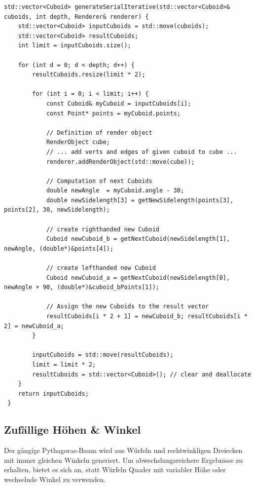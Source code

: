 \begin{lstlisting}[caption=Ausschnitt der iterativen generateSerielIterative() Funktion]
 std::vector<Cuboid> generateSerialIterative(std::vector<Cuboid>& cuboids, int depth, Renderer& renderer) {
	std::vector<Cuboid> inputCuboids = std::move(cuboids);
	std::vector<Cuboid> resultCuboids;
	int limit = inputCuboids.size();

	for (int d = 0; d < depth; d++) {
		resultCuboids.resize(limit * 2);

		for (int i = 0; i < limit; i++) {
			const Cuboid& myCuboid = inputCuboids[i];
			const Point* points = myCuboid.points;

			// Definition of render object
			RenderObject cube;
            // ... add verts and edges of given cuboid to cube ...
			renderer.addRenderObject(std::move(cube));

			// Computation of next Cuboids
			double newAngle  = myCuboid.angle - 30;
			double newSidelength[3] = getNewSidelength(points[3], points[2], 30, newSidelength);

            // create righthanded new Cuboid
			Cuboid newCuboid_b = getNextCuboid(newSidelength[1], newAngle, (double*)&points[4]);

            // create lefthanded new Cuboid
			Cuboid newCuboid_a = getNextCuboid(newSidelength[0], newAngle + 90, (double*)&cuboid_bPoints[1]);

			// Assign the new Cuboids to the result vector
			resultCuboids[i * 2 + 1] = newCuboid_b; resultCuboids[i * 2] = newCuboid_a;
		}

		inputCuboids = std::move(resultCuboids);
		limit = limit * 2;
		resultCuboids = std::vector<Cuboid>(); // clear and deallocate
	}
	return inputCuboids;
 }
\end{lstlisting}
\subsection{Zufällige Höhen \& Winkel}
\vspace{-0.2cm}
Der gängige Pythagoras-Baum wird aus Würfeln und rechtwinkligen Dreiecken mit immer gleichen Winkeln generiert. Um abwechslungsreichere Ergebnisse 
zu erhalten, bietet es sich an, statt Würfeln Quader mit variabler Höhe oder wechselnde Winkel zu verwenden.

\vspace{-0.5cm}
